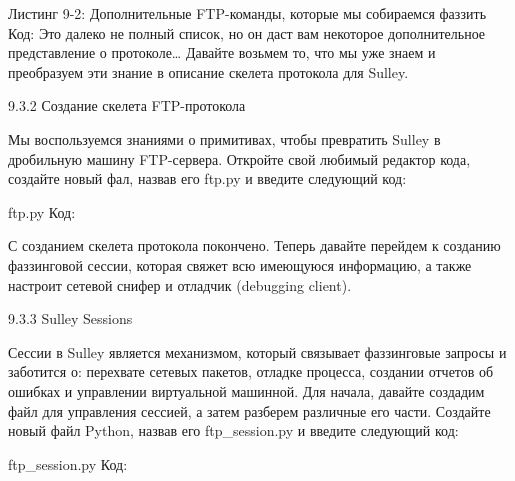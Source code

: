 \documentclass[12pt]{book}
\begin{document}
Листинг 9-2: Дополнительные FTP-команды, которые мы собираемся фаззить
Код:
Это далеко не полный список, но он даст вам некоторое дополнительное представление о протоколе… Давайте возьмем то, что мы уже знаем и преобразуем эти знание в описание скелета протокола для Sulley.

9.3.2 Создание скелета FTP-протокола

Мы воспользуемся знаниями о примитивах, чтобы превратить Sulley в дробильную машину FTP-сервера. Откройте свой любимый редактор кода, создайте новый фал, назвав его ftp.py и введите следующий код:

ftp.py
Код:






С созданием скелета протокола покончено. Теперь давайте перейдем к созданию фаззинговой сессии, которая свяжет всю имеющуюся информацию, а также настроит сетевой снифер и отладчик (debugging client). 

9.3.3 Sulley Sessions

Сессии в Sulley является механизмом, который связывает фаззинговые запросы и заботится о: перехвате сетевых пакетов, отладке процесса, создании отчетов об ошибках и управлении виртуальной машинной. Для начала, давайте создадим файл для управления сессией, а затем разберем различные его части. Создайте новый файл Python, назвав его ftp\_session.py и введите следующий код:

ftp\_session.py
Код:
\end{document}
